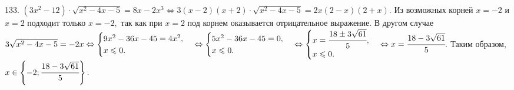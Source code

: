 133. $(3x^2-12)\cdot\sqrt{x^2-4x-5}=8x-2x^3\Leftrightarrow 3(x-2)(x+2)\cdot\sqrt{x^2-4x-5}=2x(2-x)(2+x).$ Из возможных корней $x=-2$ и $x=2$ подходит только $x=-2,$ так как при $x=2$ под корнем оказывается отрицательное выражение. В другом случае $3\sqrt{x^2-4x-5}=-2x \Leftrightarrow\begin{cases}9x^2-36x-45=4x^2,\\ x\leqslant0.\end{cases}\Leftrightarrow\begin{cases}5x^2-36x-45=0,\\ x\leqslant0.\end{cases}\Leftrightarrow\begin{cases}x=\cfrac{18\pm3\sqrt{61}}{5},\\ x\leqslant0.\end{cases}\Leftrightarrow x=\cfrac{18-3\sqrt{61}}{5}.$ Таким образом,\\ $x\in\left\{-2; \cfrac{18-3\sqrt{61}}{5}\right\}.$\\

